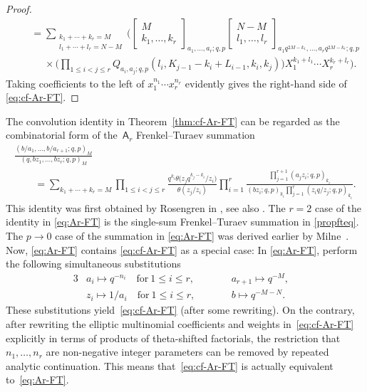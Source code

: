 \documentclass[10pt,a4paper]{amsart}
\numberwithin{equation}{section}
\theoremstyle{definition}
\newcommand{\ta}{\theta}
\begin{document}
\begin{proof}
\begin{gather*}
\qquad=\sum_{\substack{k_1+\cdots+k_r=M\\l_1+\cdots+l_r=N-M}}\bigg(
\begin{bmatrix}M\\k_1,\dots,k_r\end{bmatrix}_{a_1,\dots,a_r;q,p}
\begin{bmatrix}N-M\\l_1,\dots,l_r\end{bmatrix}_{a_1q^{2M-k_1},\dots,a_rq^{2M-k_r};q,p}\\
\phantom{\qquad=}{}\times
 \bigg(\prod_{1\le i<j\le r}Q_{a_i,a_j;q,p}(l_i,K_{j-1}-k_i+L_{i-1},k_i,k_j)\bigg)
X_1^{k_1+l_1}\cdots X_r^{k_r+l_r}\bigg).
\end{gather*}
Taking coefficients to the left of $x_1^{n_1}\cdots x_r^{n_r}$ evidently
gives the right-hand side of \eqref{eq:cf-Ar-FT}.
\end{proof}


The convolution identity in Theorem~\ref{thm:cf-Ar-FT} can be regarded
as the combinatorial form of the~$\mathsf A_r$ Frenkel--Turaev
summation
\begin{gather}
\frac{(b/a_1,\dots,b/a_{r+1};q,p)_M}{(q,bz_1,\dots,bz_r;q,p)_M}\nonumber\\
\qquad=\sum_{k_1+\cdots+k_r=M}\prod_{1\le i<j\le r}
\frac{q^{k_i} \ta\bigl(z_jq^{k_j-k_i}/z_i\bigr)}{\ta(z_j/z_i)}
\prod_{i=1}^r\frac{\prod_{j=1}^{r+1}(a_jz_i;q,p)_{k_i}}
{(bz_i;q,p)_{k_i}\prod_{j=1}^r(z_iq/z_j;q,p)_{k_i}}.\label{eq:Ar-FT}
\end{gather}
This identity
was first obtained by Rosengren in \cite[Theorem~5.1]{R04},
see also \cite[equation~(11.7.8)]{GR}.
The $r=2$ case of the identity in \eqref{eq:Ar-FT} is the single-sum
Frenkel--Turaev summation in \eqref{propfteq}.
The $p\to 0$ case of the summation in \eqref{eq:Ar-FT}
was derived earlier by Milne~\cite[Theorem~6.17]{M88}.
Now, \eqref{eq:Ar-FT} contains \eqref{eq:cf-Ar-FT} as a special case:
In \eqref{eq:Ar-FT}, perform the following simultaneous substitutions
\begin{alignat*}{3}
& a_i\mapsto q^{-n_i}\quad\text{for}\ 1\le i\le r,\qquad&&
 a_{r+1}\mapsto q^{-M},&\\
& z_i\mapsto 1/a_i\quad\text{for}\ 1\le i\le r,\qquad&&
 b\mapsto q^{-M-N}.&
\end{alignat*}
These substitutions yield~\eqref{eq:cf-Ar-FT} (after some rewriting).
On the contrary, after rewriting the elliptic multinomial coefficients
and weights in~\eqref{eq:cf-Ar-FT} explicitly in terms of products
of theta-shifted factorials,
the restriction that $n_1,\dots,n_r$ are non-negative integer parameters
can be removed by repeated analytic continuation.
This means that~\eqref{eq:cf-Ar-FT} is actually equivalent to~\eqref{eq:Ar-FT}.
\end{document}
